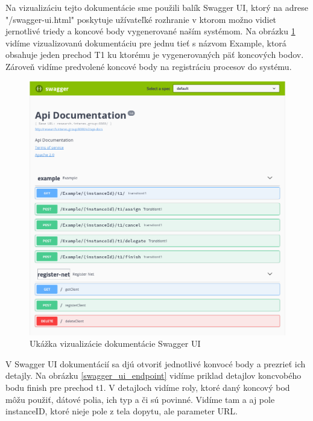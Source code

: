 Na vizualizáciu tejto dokumentácie sme použili balík Swagger UI, ktorý na adrese "/swagger-ui.html" poskytuje užívateľké rozhranie v ktorom možno vidiet jernotlivé triedy a koncové body vygenerované naším systémom. Na obrázku \ref{swagger_ui} vidíme vizualizovanú dokumentáciu pre jednu tieť s názvom Example, ktorá obsahuje jeden prechod T1 ku ktorému je vygenerovaných päť koncových bodov. Zároveň vidíme predvolené koncové body na registráciu procesov do systému.  

\begin{figure}[!htbp] 
	\centering 
	\includegraphics[width=16cm]{img/swagger_ui.png} 
	\caption{Ukážka vizualizácie dokumentácie Swagger UI} 
	\label{swagger_ui} 
\end{figure}

V Swagger UI dokumentácií sa djú otvoriť jednotlivé konvocé body a prezrieť ich detajly. Na obrázku \ref{swagger_ui_endpoint} vidíme priklad detajlov koncvobého bodu finish pre prechod t1. V detajloch vidíme roly, ktoré daný koncový bod môžu použiť, dátové polia, ich typ a či sú povinné. Vidíme tam a aj pole instanceID, ktoré nieje pole z tela dopytu, ale parameter URL.
 

